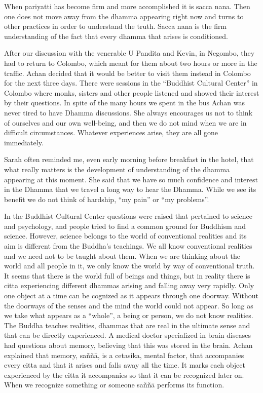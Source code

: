 When pariyatti has become firm and more accomplished it is sacca nana. Then one 
does not move away from the dhamma appearing right now and turns to other practices in order to understand the truth. Sacca nana is the firm understanding of the fact 
that every dhamma that arises is conditioned. 

After our discussion with the venerable U Pandita and Kevin, in Negombo, they had 
to return to Colombo, which meant for them about two hours or more in the traffic. 
Achan decided that it would be better to visit them instead in Colombo for the next 
three days. There were sessions in the ``Buddhist Cultural Center'' in Colombo where 
monks, sisters and other people listened and showed their interest by their questions. 
In spite of the many hours we spent in the bus Achan was never tired to have 
Dhamma discussions. She always encourages us not to think of ourselves and our 
own well-being, and then we do not mind when we are in difficult circumstances. 
Whatever experiences arise, they are all gone immediately. 

Sarah often reminded me, even early morning before breakfast in the hotel, that what 
really matters is the development of understanding of the dhamma appearing at this 
moment. She said that we have so much confidence and interest in the Dhamma that 
we travel a long way to hear the Dhamma. While we see its benefit we do not think 
of hardship, ``my pain'' or ``my problems''. 

In the Buddhist Cultural Center questions were raised that pertained to science and 
psychology, and people tried to find a common ground for Buddhism and science. 
However, science belongs to the world of conventional realities and its aim is different from the Buddha’s teachings. We all know conventional realities and we need not 
to be taught about them. When we are thinking about the world and all people in it, 
we only know the world by way of conventional truth. It seems that there is the world 
full of beings and things, but in reality there is citta experiencing different dhammas 
arising and falling away very rapidly. Only one object at a time can be cognized as it 
appears through one doorway. Without the doorways of the senses and the mind the 
world could not appear. So long as we take what appears as a ``whole'', a being or 
person, we do not know realities. The Buddha teaches realities, dhammas that are real 
in the ultimate sense and that can be directly experienced. A medical doctor specialized in brain diseases had questions about memory, believing that this was stored in 
the brain. Achan explained that memory, saññā, is a cetasika, mental factor, that accompanies every citta and that it arises and falls away all the time. It marks each object experienced by the citta it accompanies so that it can be recognized later on. 
When we recognize something or someone saññā performs its function. 

